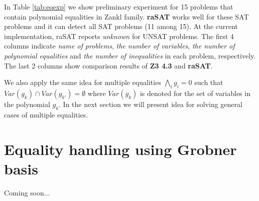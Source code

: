In Table \ref{tab:eqexp} we show preliminary experiment for 15 problems that contain polynomial equalities in Zankl family. \textbf{raSAT} works well for these SAT problems and it can detect all SAT problems (11 among 15). At the current implementation, raSAT reports \emph{unknown} for UNSAT problems. The first 4 columns indicate \emph{name of problems}, \emph{the number of variables}, \emph{the number of polynomial equalities} and \emph{the number of inequalities}  in each problem, respectively. The last 2 columns show comparison results of \textbf{Z3 4.3} and \textbf{raSAT}.
\begin{table}
\centering
{}
\caption{Experimental results for 15 equality problems of Zankl family}
\label{tab:eqexp}
\end{table}

We also apply the same idea for multiple equalities $\bigwedge \limits_{i} g_i = 0$ such that $Var(g_k) \cap Var(g_{k'}) = \emptyset$ where $Var(g_k)$ is denoted for the set of variables in the polynomial $g_k$. In the next section we will present idea for solving general cases of multiple equalities.


\section{Equality handling using Grobner basis}
Coming soon...

